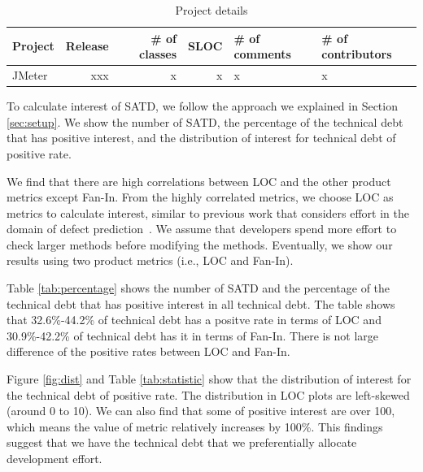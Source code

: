 \begin{table}[tb]
  \caption{Project details}
  \label{tab:project}
  \centering

  \begin{tabular}{l|rrrp{1.0cm}p{1.0cm}}
  \hline
    Project & Release & \# of classes & SLOC & \# of comments & \# of contributors \\
  \hline
    JMeter & xxx &   x  &    x  &        x  &    x   \\
  \hline
  \end{tabular}
\end{table}



To calculate interest of SATD, we follow the approach we explained in Section \ref{sec:setup}.
We show the number of SATD, the percentage of the technical debt that has positive interest, and the distribution of interest for technical debt of positive rate.

We find that there are high correlations between LOC and the other product metrics except Fan-In. 
From the highly correlated metrics, we choose LOC as metrics to calculate interest, similar to previous work that considers effort in the domain of defect prediction~\cite{Kamei2010ICSM,Kamei2013TSE}. We assume that developers spend more effort to check larger methods before modifying the methods. Eventually, we show our results using two product metrics (i.e., LOC and Fan-In).

Table \ref{tab:percentage} shows the number of SATD and the percentage of the technical debt that has positive interest in all technical debt. The table shows that 32.6\%-44.2\% of technical debt has a positve rate in terms of LOC and 30.9\%-42.2\% of technical debt has it in terms of Fan-In. 
There is not large difference of the positive rates between LOC and Fan-In. 

Figure \ref{fig:dist} and Table \ref{tab:statistic} show that the distribution of interest for the technical debt of positive rate. The distribution in LOC plots are left-skewed (around 0 to 10). We can also find that some of positive interest are over 100, which means the value of metric relatively increases by 100\%.
This findings suggest that we have the technical debt that we preferentially allocate development effort.



